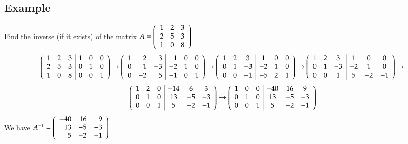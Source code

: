 \documentclass{article}[18pt]
\begin{document}
\subsection{Example}
Find the inverse (if it exists) of the matrix  $A = \left( \begin{array} { c c c } { 1 } & { 2 } & { 3 } \\ { 2 } & { 5 } & { 3 } \\ { 1 } & { 0 } & { 8 } \end{array} \right)$
$$\left( \begin{array} { l l l | l l l } { 1 } & { 2 } & { 3 } & { 1 } & { 0 } & { 0 } \\ { 2 } & { 5 } & { 3 } & { 0 } & { 1 } & { 0 } \\ { 1 } & { 0 } & { 8 } & { 0 } & { 0 } & { 1 } \end{array} \right) \rightarrow \left( \begin{array} { r r r | r r r } { 1 } & { 2 } & { 3 } & { 1 } & { 0 } & { 0 } \\ { 0 } & { 1 } & { - 3 } & { - 2 } & { 1 } & { 0 } \\ { 0 } & { - 2 } & { 5 } & { - 1 } & { 0 } & { 1 } \end{array} \right) \rightarrow \left( \begin{array} { c c c | c c c } { 1 } & { 2 } & { 3 } & { 1 } & { 0 } & { 0 } \\ { 0 } & { 1 } & { - 3 } & { - 2 } & { 1 } & { 0 } \\ { 0 } & { 0 } & { - 1 } & { - 5 } & { 2 } & { 1 } \end{array} \right) \rightarrow \left( \begin{array} { c c c | c c c } { 1 } & { 2 } & { 3 } & { 1 } & { 0 } & { 0 } \\ { 0 } & { 1 } & { - 3 } & { - 2 } & { 1 } & { 0 } \\ { 0 } & { 0 } & { 1 } & { 5 } & { - 2 } & { - 1 } \end{array} \right) \rightarrow$$
$$\left( \begin{array} { c c c | c c c } { 1 } & { 2 } & { 0 } & { - 14 } & { 6 } & { 3 } \\ { 0 } & { 1 } & { 0 } & { 13 } & { - 5 } & { - 3 } \\ { 0 } & { 0 } & { 1 } & { 5 } & { - 2 } & { - 1 } \end{array} \right) \rightarrow \left( \begin{array} { c c c | c c c } { 1 } & { 0 } & { 0 } & { - 40 } & { 16 } & { 9 } \\ { 0 } & { 1 } & { 0 } & { 13 } & { - 5 } & { - 3 } \\ { 0 } & { 0 } & { 1 } & { 5 } & { - 2 } & { - 1 } \end{array} \right)$$
We have $A ^ { - 1 } = \left( \begin{array} { r r r } { - 40 } & { 16 } & { 9 } \\ { 13 } & { - 5 } & { - 3 } \\ { 5 } & { - 2 } & { - 1 } \end{array} \right)$
\end{document}
